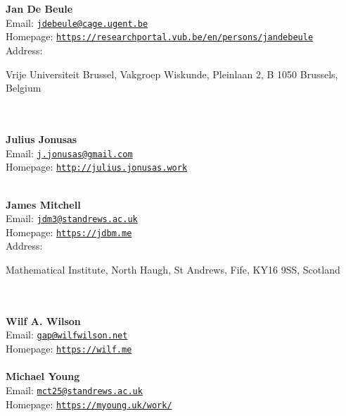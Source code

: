 \documentclass[a4paper,11pt]{report}
\begin{document}
\begin{titlepage}
\mbox{}\\
{\mbox{}\\
\small \noindent \textbf{ Jan De Beule\\
    }  Email: \href{mailto://jdebeule@cage.ugent.be} {\texttt{jdebeule@cage.ugent.be}}\\
  Homepage: \href{https://researchportal.vub.be/en/persons/jan-de-beule} {\texttt{https://researchportal.vub.be/en/persons/jan\texttt{}de\texttt{}beule}}\\
  Address: \begin{minipage}[t]{8cm}\noindent
 Vrije Universiteit Brussel, Vakgroep Wiskunde, Pleinlaan 2, B
\texttt{} 1050 Brussels, Belgium\\
 \end{minipage}
}\\
{\mbox{}\\
\small \noindent \textbf{ Julius Jonusas\\
   }  Email: \href{mailto://j.jonusas@gmail.com} {\texttt{j.jonusas@gmail.com}}\\
  Homepage: \href{http://julius.jonusas.work} {\texttt{http://julius.jonusas.work}}}\\
{\mbox{}\\
\small \noindent \textbf{ James Mitchell\\
    }  Email: \href{mailto://jdm3@st-andrews.ac.uk} {\texttt{jdm3@st\texttt{}andrews.ac.uk}}\\
  Homepage: \href{https://jdbm.me} {\texttt{https://jdbm.me}}\\
  Address: \begin{minipage}[t]{8cm}\noindent
 Mathematical Institute, North Haugh, St Andrews, Fife, KY16 9SS, Scotland\\
 \end{minipage}
}\\
{\mbox{}\\
\small \noindent \textbf{ Wilf A. Wilson\\
   }  Email: \href{mailto://gap@wilf-wilson.net} {\texttt{gap@wilf\texttt{}wilson.net}}\\
  Homepage: \href{https://wilf.me} {\texttt{https://wilf.me}}}\\
{\mbox{}\\
\small \noindent \textbf{ Michael Young\\
    }  Email: \href{mailto://mct25@st-andrews.ac.uk} {\texttt{mct25@st\texttt{}andrews.ac.uk}}\\
  Homepage: \href{https://myoung.uk/work/} {\texttt{https://myoung.uk/work/}}\\
}
\end{titlepage}
\end{document}

